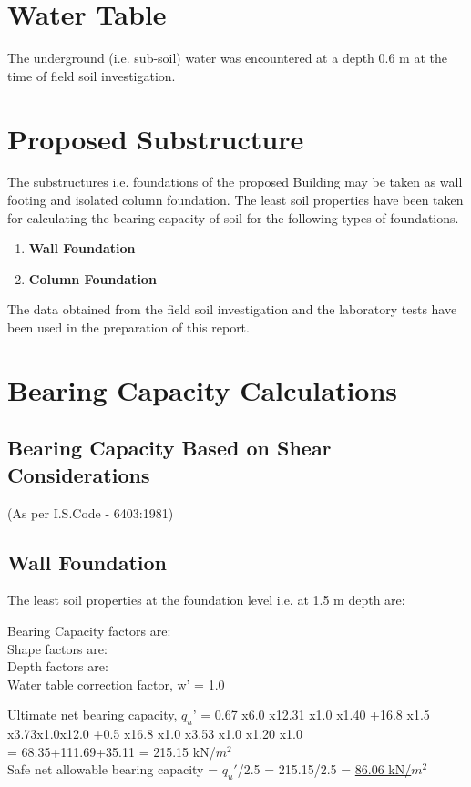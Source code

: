 \documentclass{soil1}
\begin{document}
\section{Water Table}
The underground (i.e. sub-soil) water was encountered at a depth 0.6 m at the time of field soil
investigation.
\section{Proposed Substructure}
The substructures i.e. foundations of the proposed Building may be taken as wall footing and isolated
column foundation. The least soil properties have been taken for calculating the bearing capacity of
soil for the following types of foundations.
\begin{enumerate}
\item{\large{\textbf{Wall Foundation}}}\\
\item{\large{\textbf{Column Foundation}}}\\
\end{enumerate}
The data obtained from the field soil investigation and the laboratory tests have been used in the
preparation of this report.
\section{Bearing Capacity Calculations}
\subsection{Bearing Capacity Based on Shear Considerations}
(As per I.S.Code - 6403:1981)
\subsection{Wall Foundation}

The least soil properties at the foundation level i.e. at 1.5 m depth are:\\

Bearing Capacity factors are:\\
Shape factors are:\\
Depth factors are:\\    
Water table correction factor, w' = 1.0

Ultimate net bearing capacity, $q_u$' = 0.67 x6.0 x12.31 x1.0 x1.40 +16.8 x1.5 x3.73x1.0x12.0 +0.5 x16.8 x1.0 x3.53 x1.0 x1.20 x1.0\\
= 68.35+111.69+35.11 = 215.15 kN/$m^2$ \\	
Safe net allowable bearing capacity = $q_u'$/2.5 = 215.15/2.5 = \underline{86.06 kN/$m^2$}
\end{document}
